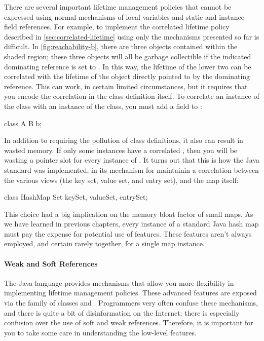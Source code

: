 There are several important lifetime management policies that cannot be expressed
using normal mechanisms of local variables and static and instance field
references. For example, to implement the correlated lifetime policy described in
\autoref{sec:correlated-lifetime} using only the mechanisms presented so far is
difficult. In \autoref{fig:reachability-b}, there are three objects contained
within the shaded region; these three objects will all be garbage collectible if
the indicated dominating reference is set to . In this way, the
lifetime of the lower two can be correlated with the lifetime of the object
directly pointed to by the dominating reference. This can work, in certain
limited circumstances, but it requires that you encode the correlation in the
class definition itself. To correlate an instance of the  class with an
instance of the  class, you must add a field to :
\begin{shortlisting}
class A {
   B b;
}
\end{shortlisting}
In addition to requiring the pollution of class definitions, it also can result
in wasted memory. If only some  instances have a correlated ,
then you will be wasting a pointer slot for every instance of . It turns
out that this is how the Java standard  was implemented, in its
mechanism for maintainin a correlation between the various views (the key set,
value set, and entry set), and the map itself:
\begin{shortlisting}
class HashMap {
   Set keySet, valueSet, entrySet;
}
\end{shortlisting}
This choice had a big implication on the memory bloat factor of small maps. As
we have learned in previous chapters, every instance of a standard Java hash map
must pay the expense for potential use of features. These features aren't
always employed, and certain rarely together, for a single map instance.

\paragraph{Weak and Soft References}
The Java language provides mechanisms that allow you more flexibility in
implementing lifetime management policies. These advanced features are exposed
via the  family of classes and \tls. Programmers
very often confuse these mechanisms, and there is quite a bit of disinformation
on the Internet; there is especially confusion over the use of soft and weak
references. Therefore, it is important for you to take some care in understanding
the low-level features.


